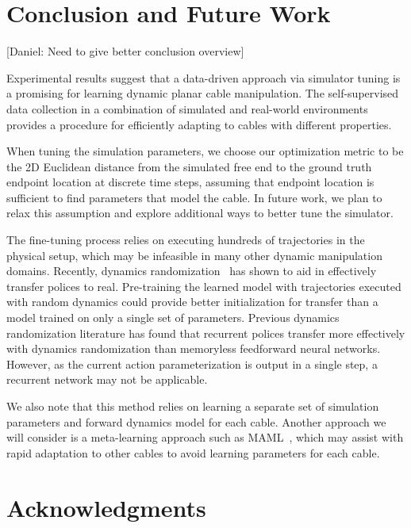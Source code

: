\documentclass[letterpaper, 10 pt, conference]{ieeeconf}  %
\newcommand{\remark}[3]{{\color{#2}[#1: #3]}}
\newcommand{\daniel}[1]{\remark{Daniel}{blue}{#1}}
\begin{document}

\section{Conclusion and Future Work}\label{sec:conclusion}

\daniel{Need to give better conclusion overview}

Experimental results suggest that a data-driven approach via simulator tuning is a promising for learning dynamic planar cable manipulation. The self-supervised data collection in a combination of simulated and real-world environments provides a procedure for efficiently adapting to cables with different properties.

When tuning the simulation parameters, we choose our optimization metric to be the 2D Euclidean distance from the simulated free end to the ground truth endpoint location at discrete time steps, assuming that endpoint location is sufficient to find parameters that model the cable. In future work, we plan to relax this assumption and explore additional ways to better tune the simulator.

The fine-tuning process relies on executing hundreds of trajectories in the physical setup, which may be infeasible in many other dynamic manipulation domains. Recently, dynamics randomization~\cite{dynamics_randomization_2018} has shown to aid in effectively transfer polices to real. Pre-training the learned model with trajectories executed with random dynamics could provide better initialization for transfer than a model trained on only a single set of parameters. Previous dynamics randomization literature has found that recurrent polices transfer more effectively with dynamics randomization than memoryless feedforward neural networks. However, as the current action parameterization is output in a single step, a recurrent network may not be applicable. 

We also note that this method relies on learning a separate set of simulation parameters and forward dynamics model for each cable. Another approach we will consider is a meta-learning approach such as MAML~\cite{maml}, which may assist with rapid adaptation to other cables to avoid learning parameters for each cable. 


\section*{Acknowledgments}
\end{document}
